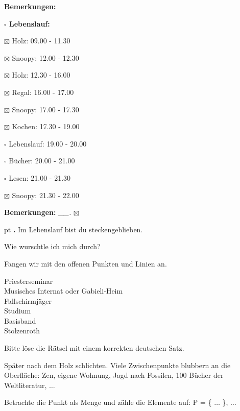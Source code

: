 \documentclass[10pt,a4paper]{article}
\newcounter{notec}
\newcommand\notep[1]{%
  \stepcounter{notec}
  \vskip #1pt
  {\bf\arabic{notec}.}
}
\newcommand\prop[1] {{\color {alizarin} {\bf #1}}}             %
\newcommand\mand[1] {{\color {burntorange} {\bf #1}}}          %
\newcommand\bottomspace{\vskip 4pt}
\newcommand\n[1] { {\sl #1.} \hskip 5pt }
\begin{document}
\begin{mdframed}[style=daystyle]
\begin{labeling}{{\mand {Bemerkungen:}}}
\begin{minipage}{0.75\textwidth}
\begin{labeling}{\prop {$\square$ {Lebenslauf:}}}
      \item[$\boxtimes$ Holz:]       09.00 - 11.30        
      \item[$\boxtimes$ Snoopy:]     12.00 - 12.30
      \item[$\boxtimes$ Holz:]       12.30 - 16.00        
      \item[$\boxtimes$ Regal:]      16.00 - 17.00        
      \item[$\boxtimes$ Snoopy:]     17.00 - 17.30
      \item[$\boxtimes$ Kochen:]     17.30 - 19.00
      \item[$\square$ Lebenslauf:] 19.00 - 20.00
      \item[$\square$ Bücher:]     20.00 - 21.00
      \item[$\square$ Lesen:]      21.00 - 21.30        
      \item[$\boxtimes$ Snoopy:]     21.30 - 22.00
      \end{labeling}
    \end{minipage}
    \bottomspace
  \item[{\mand {Bemerkungen:}}]   \n{\_\_} $\boxtimes$
  \end{labeling}
    
  \setcounter{notec}{0}
  
  \notep 0 Im Lebenslauf bist du steckengeblieben.

  \vskip 2pt
  Wie wurschtle ich mich durch?

  \vskip 2pt
  Fangen wir mit den offenen Punkten und Linien an.

  \vskip 2pt
  Priesterseminar \\
  Musisches Internat oder Gabieli-Heim \\
  Fallschirmjäger \\
  Studium \\
  Basisband \\
  Stolzenroth

  \vskip 2pt
  Bitte löse die Rätsel mit einem korrekten deutschen Satz.

  \vskip 2pt
  Später nach dem Holz schlichten. Viele Zwischenpunkte blubbern an die
  Oberfläche: Zen, eigene Wohnung, Jagd nach Fossilen, 100 Bücher der
  Weltliteratur, $\ldots$

  \vskip 2pt
  Betrachte die Punkt als Menge und zähle die Elemente auf: P = \{ $\ldots$ \}, $\ldots$
  
\end{mdframed}
\end{document}
